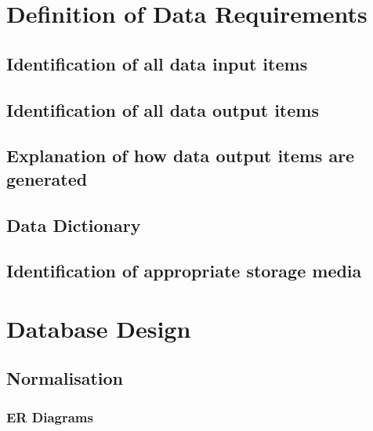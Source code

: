 \section{Definition of Data Requirements}

\subsection{Identification of all data input items}

\subsection{Identification of all data output items}

\subsection{Explanation of how data output items are generated}

\subsection{Data Dictionary}

\subsection{Identification of appropriate storage media}


\newpage

\section{Database Design}

\subsection{Normalisation}
 
\subsubsection{ER Diagrams}


